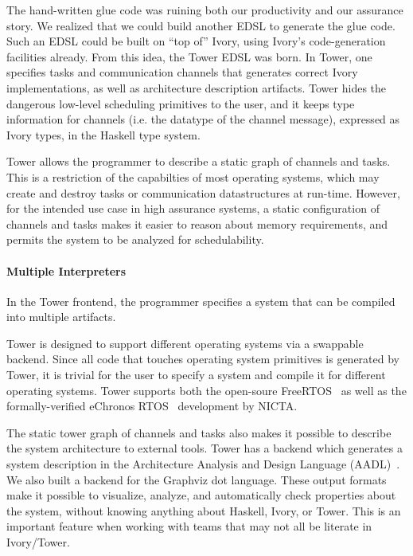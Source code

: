 The hand-written glue code was ruining both our productivity and our assurance
story.  We realized that we could build another EDSL to generate the glue code.
Such an EDSL could be built on ``top of'' Ivory, using Ivory's code-generation
facilities already.  From this idea, the Tower EDSL was born.  In Tower, one
specifies tasks and communication channels that generates correct Ivory
implementations, as well as architecture description artifacts. Tower hides the
dangerous low-level scheduling primitives to the user, and it keeps type
information for channels (i.e. the datatype of the channel message), expressed
as Ivory types, in the Haskell type system.

Tower allows the programmer to describe a static graph of channels and tasks.
This is a restriction of the capabilties of most operating systems, which may
create and destroy tasks or communication datastructures at run-time. However,
for the intended use case in high assurance systems, a static configuration of
channels and tasks makes it easier to reason about memory requirements, and
permits the system to be analyzed for schedulability.

\paragraph{Multiple Interpreters}


In the Tower frontend, the programmer specifies a system that can be compiled into
multiple artifacts.

Tower is designed to support different operating systems via a swappable
backend. Since all code that touches operating system primitives is generated by
Tower, it is trivial for the user to specify a system and compile it for
different operating systems. Tower supports both the open-soure
FreeRTOS~\cite{freertos} as well as the formally-verified eChronos
RTOS~\cite{echronos} development by NICTA.

The static tower graph of channels and tasks also makes it possible to
describe the system architecture to external tools. Tower has a backend which
generates a system description in the Architecture Analysis and Design Language
(AADL)~\cite{SAE:AADL}. We also built a backend for the Graphviz dot language.
These output formats make it possible to visualize, analyze, and automatically
check properties about the system, without knowing anything about Haskell,
Ivory, or Tower. This is an important feature when working with teams that may
not all be literate in Ivory/Tower.

